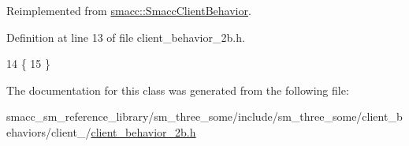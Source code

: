 Reimplemented from \hyperlink{classsmacc_1_1SmaccClientBehavior_a7962382f93987c720ad432fef55b123f}{smacc\+::\+Smacc\+Client\+Behavior}.



Definition at line 13 of file client\+\_\+behavior\+\_\+2b.\+h.


\begin{DoxyCode}
14     \{
15     \}
\end{DoxyCode}


The documentation for this class was generated from the following file\+:\begin{DoxyCompactItemize}
\item 
smacc\+\_\+sm\+\_\+reference\+\_\+library/sm\+\_\+three\+\_\+some/include/sm\+\_\+three\+\_\+some/client\+\_\+behaviors/client\+\_/\hyperlink{client__behavior__2b_8h}{client\+\_\+behavior\+\_\+2b.\+h}\end{DoxyCompactItemize}
